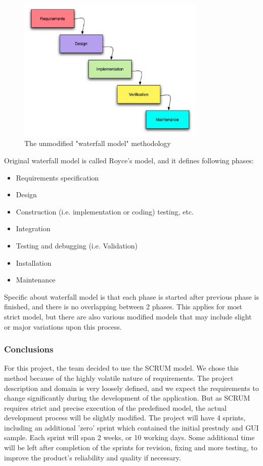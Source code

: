 \begin{figure}[htb]
	\centering
	\includegraphics[width=0.8\textwidth]{prestudy/development_process/waterfall.jpg}
	\caption{The unmodified "waterfall model" methodology\cite{worldpress:waterfall}}
	\label{fig:waterfall-model}
\end{figure}

Original waterfall model is called Royce's model, and it defines following phases:

\begin{itemize}
	\item Requirements specification
	\item Design
	\item Construction (i.e. implementation or coding) testing, etc.
	\item Integration
	\item Testing and debugging (i.e. Validation)
	\item Installation
	\item Maintenance
\end{itemize}

Specific about waterfall model is that each phase is started after previous phase is finished, and there is no overlapping between 2 phases. This applies for most strict model, but there are also various modified models that may include slight or major variations upon this process.

\subsubsection{Conclusions}
For this project, the team decided to use the SCRUM model. We chose this method because of the highly volatile nature
of requirements. The project description and domain is very loosely defined,
and we expect the requirements to change significantly during the development
of the application. But as SCRUM requires strict and precise
execution of the predefined model, the actual development process will be slightly modified.
The project will have 4 sprints, including an additional 'zero' sprint which contained the initial
prestudy and GUI sample. Each sprint will span 2 weeks, or 10 working days.
Some additional time will be left after completion of the sprints for revision,
fixing and more testing, to improve the product's reliability and quality if necessary.
